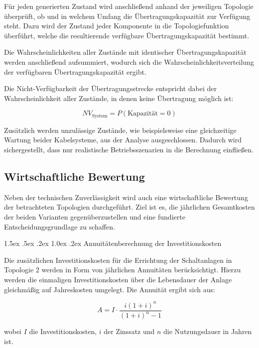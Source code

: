 \documentclass[a4paper,12pt]{article}
\makeatletter
\renewcommand\paragraph{\@startsection{paragraph}{4}{\z@}%
	{1.5ex \@plus .5ex \@minus .2ex}%
	{1.0ex \@plus .2ex}%
	{\normalfont\normalsize\bfseries}}%
\makeatother
\begin{document}
Für jeden generierten Zustand wird anschließend anhand der jeweiligen
Topologie überprüft, ob und in welchem Umfang die Übertragungskapazität
zur Verfügung steht. Dazu wird der Zustand jeder Komponente in die
Topologiefunktion überführt, welche die resultierende verfügbare
Übertragungskapazität bestimmt.

Die Wahrscheinlichkeiten aller Zustände mit identischer
Übertragungskapazität werden anschließend aufsummiert, wodurch sich die
Wahrscheinlichkeitsverteilung der verfügbaren Übertragungskapazität ergibt.

Die Nicht-Verfügbarkeit der Übertragungsstrecke entspricht dabei der
Wahrscheinlichkeit aller Zustände, in denen keine Übertragung möglich ist:

\begin{equation}
NV_{\text{System}} = P(\text{Kapazität} = 0)
\end{equation}

Zusätzlich werden unzulässige Zustände, wie beispielsweise eine
gleichzeitige Wartung beider Kabelsysteme, aus der Analyse ausgeschlossen.
Dadurch wird sichergestellt, dass nur realistische Betriebsszenarien in
die Berechnung einfließen.

\subsection{Wirtschaftliche Bewertung}

Neben der technischen Zuverlässigkeit wird auch eine wirtschaftliche
Bewertung der betrachteten Topologien durchgeführt. Ziel ist es, die
jährlichen Gesamtkosten der beiden Varianten gegenüberzustellen und eine
fundierte Entscheidungsgrundlage zu schaffen.

\paragraph{Annuitätenberechnung der Investitionskosten}

Die zusätzlichen Investitionskosten für die Errichtung der
Schaltanlagen in Topologie 2 werden in Form von jährlichen Annuitäten
berücksichtigt. Hierzu werden die einmaligen Investitionskosten über die
Lebensdauer der Anlage gleichmäßig auf Jahreskosten umgelegt. Die
Annuität ergibt sich aus:

\begin{equation}
A = I \cdot \frac{i(1+i)^n}{(1+i)^n - 1}
\end{equation}

wobei $I$ die Investitionskosten, $i$ der Zinssatz und $n$ die
Nutzungsdauer in Jahren ist.
\end{document}

